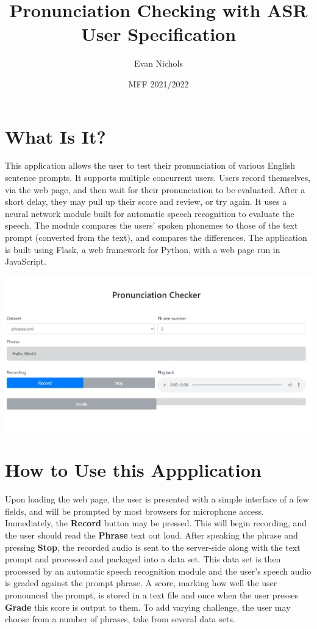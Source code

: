 \documentclass[12pt, letterpaper]{article}
\title{Pronunciation Checking with ASR\\ \small User Specification}
\author{Evan Nichols}
\date{MFF 2021/2022}
\begin{document}
\maketitle

\section*{What Is It?}
This application allows the user to test their pronunciation of various English sentence prompts. It supports multiple concurrent users. Users record themselves, via the web page, and then wait for their pronunciation to be evaluated. After a short delay, they may pull up their score and review, or try again. It uses a neural network module built for automatic speech recognition to evaluate the speech. The module compares the users' spoken phonemes to those of the text prompt (converted from the text), and compares the differences. The application is built using Flask, a web framework for Python, with a web page run in JavaScript. 

\includegraphics[scale=0.33]{images/homepage.png}


\newpage%
\section*{How to Use this Appplication}
Upon loading the web page, the user is presented with a simple interface of a few fields, and will be prompted by most browsers for microphone access. Immediately, the \textbf{Record} button may be pressed. This will begin recording, and the user should read the \textbf{Phrase} text out loud. After speaking the phrase and pressing \textbf{Stop}, the recorded audio is sent to the server-side along with the text prompt and processed and packaged into a data set. This data set is then processed by an automatic speech recognition module and the user's speech audio is graded against the prompt phrase. A score, marking how well the user pronounced the prompt, is stored in a text file and once when the user presses \textbf{Grade} this score is output to them. To add varying challenge, the user may choose from a number of phrases, take from several data sets. 
\end{document}
